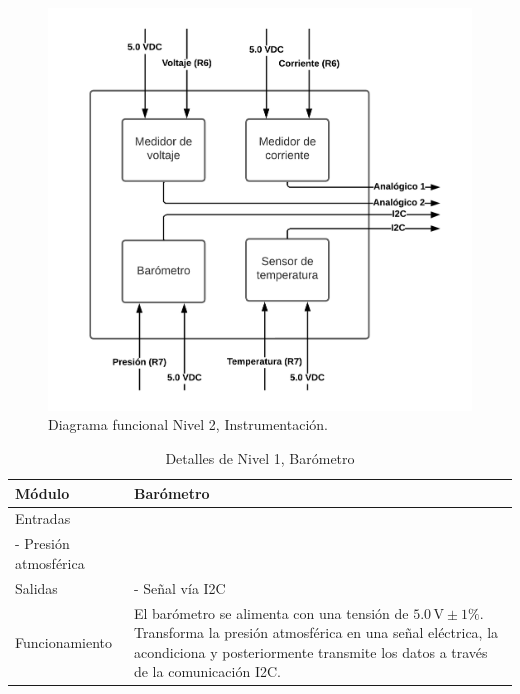 \begin{figure}[h!]
\centering
\includegraphics[width=\textwidth]{Pictures/Level2A.png}
\caption{Diagrama funcional Nivel 2, Instrumentación.}\label{fig:Level2A}
\end{figure}


\begin{table}[h!]
    \centering
    \caption{Detalles de Nivel 1, Barómetro}
    \label{tab:nivel2_Barometro}
    \begin{tabular}{ll}
    \toprule
        Módulo  & Barómetro\\ 
    \midrule
        Entradas & 
        \begin{minipage}[t]{0.75\linewidth}
  - Alimentación $5.0 \, \text{V} \pm 1\%$\\
   - Presión atmosférica
 
        \end{minipage} \\
    \midrule
        Salidas & 
        \begin{minipage}[t]{0.75\linewidth}
    - Señal vía I2C

        \end{minipage} \\
    \midrule
        Funcionamiento & 
        \begin{minipage}[t]{0.75\linewidth}
El barómetro se alimenta con una tensión de $5.0 \, \text{V} \pm 1\%$. Transforma la presión atmosférica en una señal eléctrica, la acondiciona y posteriormente transmite los datos a través de la comunicación I2C.

        \end{minipage} \\
    \bottomrule
    \end{tabular}
\end{table}

